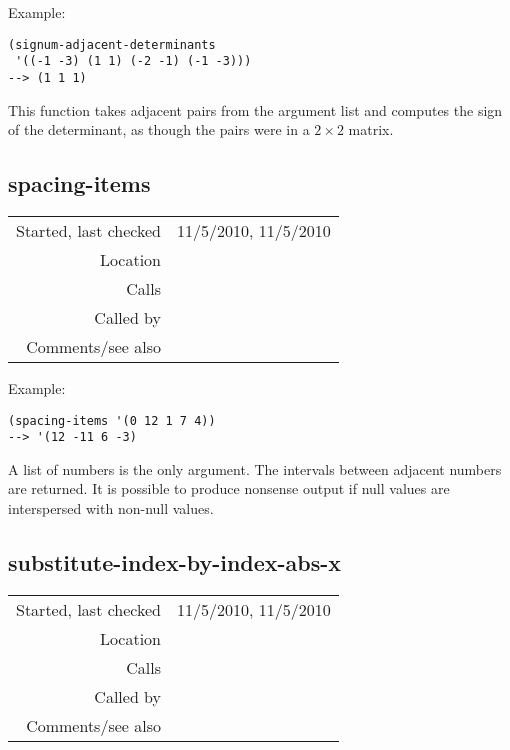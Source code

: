 \vspace{0.5cm}
\noindent Example:
\begin{verbatim}
(signum-adjacent-determinants
 '((-1 -3) (1 1) (-2 -1) (-1 -3)))
--> (1 1 1)
\end{verbatim}

\noindent This function takes adjacent pairs from the
argument list and computes the sign of the
determinant, as though the pairs were in a
$2\times 2$ matrix.


\subsection*{spacing-items}\label{fun:spacing-items}

\vspace{0.3cm}
\begin{tabular}{r|p{8cm}}
Started, last checked & 11/5/2010, 11/5/2010 \\
Location & \nameref{sec:geometric-operations} \\
Calls & \\
Called by & \nameref{fun:in-polygonp} \\
Comments/see also & 
\end{tabular}

\vspace{0.5cm}
\noindent Example:
\begin{verbatim}
(spacing-items '(0 12 1 7 4))
--> '(12 -11 6 -3)
\end{verbatim}

\noindent A list of numbers is the only argument. The
intervals between adjacent numbers are returned. It is
possible to produce nonsense output if null values are
interspersed with non-null values.


\subsection*{substitute-index-by-index-abs-x}\label{fun:substitute-index-by-index-abs-x}

\vspace{0.3cm}
\begin{tabular}{r|p{8cm}}
Started, last checked & 11/5/2010, 11/5/2010 \\
Location & \nameref{sec:geometric-operations} \\
Calls & \\
Called by & \nameref{fun:in-polygonp} \\
Comments/see also & \nameref{fun:replace-nth-in-list-with-x}
\end{tabular}

